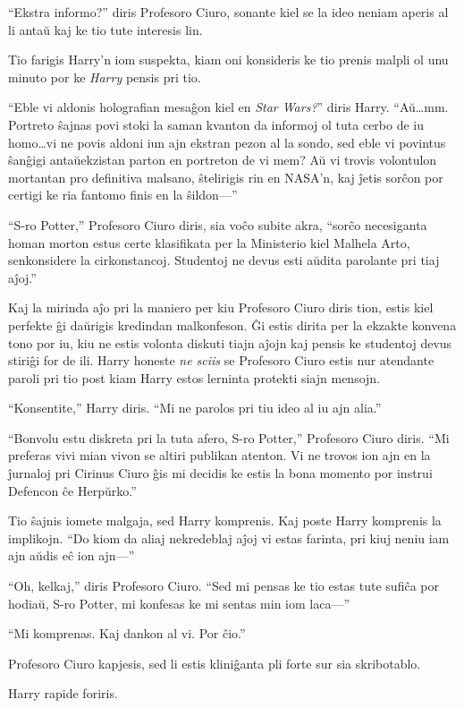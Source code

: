 ``Ekstra informo?'' diris Profesoro Ciuro, sonante kiel se la ideo
neniam aperis al li antaŭ kaj ke tio tute interesis lin.

Tio farigis Harry'n iom suspekta, kiam oni konsideris ke tio prenis
malpli ol unu minuto por ke \emph{Harry} pensis pri tio.

``Eble vi aldonis holografian mesaĝon kiel en \emph{Star Wars?}''
diris Harry. ``Aŭ\ldots mm. Portreto ŝajnas povi stoki la saman
kvanton da informoj ol tuta cerbo de iu homo\ldots vi ne povis aldoni
iun ajn ekstran pezon al la sondo, sed eble vi povintus ŝanĝigi
antaŭekzistan parton en portreton de vi mem? Aŭ vi trovis volontulon
mortantan pro definitiva malsano, ŝtelirigis rin en NASA'n, kaj ĵetis
sorĉon por certigi ke ria fantomo finis en la ŝildon—''

``S-ro Potter,'' Profesoro Ciuro diris, sia voĉo subite akra, ``sorĉo
necesiganta homan morton estus certe klasifikata per la Ministerio kiel
Malhela Arto, senkonsidere la cirkonstancoj. Studentoj ne devus
esti aŭdita parolante pri tiaj aĵoj.''

Kaj la mirinda aĵo pri la maniero per kiu Profesoro Ciuro diris tion,
estis kiel perfekte ĝi daŭrigis kredindan malkonfeson. Ĝi estis dirita
per la ekzakte konvena tono por iu, kiu ne estis volonta diskuti tiajn
aĵojn kaj pensis ke studentoj devus stiriĝi for de ili. Harry honeste
\emph{ne sciis} se Profesoro Ciuro estis nur atendante paroli pri tio
post kiam Harry estos lerninta protekti siajn mensojn.

``Konsentite,'' Harry diris. ``Mi ne parolos pri tiu ideo al iu ajn alia.''

``Bonvolu estu diskreta pri la tuta afero, S-ro Potter,'' Profesoro
Ciuro diris. ``Mi preferas vivi mian vivon se altiri publikan
atenton. Vi ne trovos ion ajn en la ĵurnaloj pri Cirinus Ciuro ĝis mi
decidis ke estis la bona momento por instrui Defencon ĉe Herpŭrko.''


Tio ŝajnis iomete malgaja, sed Harry komprenis. Kaj poste Harry
komprenis la implikojn. ``Do kiom da aliaj nekredeblaj aĵoj vi estas
farinta, pri kiuj neniu iam ajn aŭdis eĉ ion ajn—'' 

``Oh, kelkaj,'' diris Profesoro Ciuro. ``Sed mi pensas ke tio estas
tute sufiĉa por hodiaŭ, S-ro Potter, mi konfesas ke mi sentas min iom
laca—''

``Mi komprenas. Kaj dankon al vi. Por ĉio.''

Profesoro Ciuro kapjesis, sed li estis kliniĝanta pli forte sur sia skribotablo.

Harry rapide foriris.



